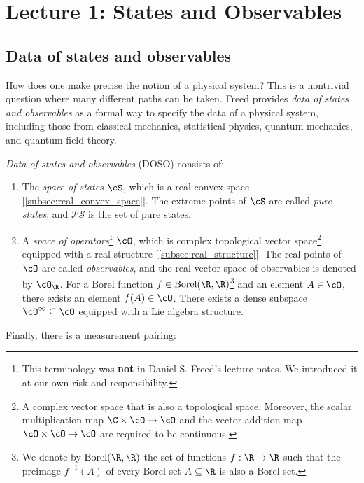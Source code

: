 \newpage
\section{Lecture 1: States and Observables}
\subsection{Data of states and observables}
How does one make precise the notion of a physical system? This is a nontrivial question where many different paths can be taken. Freed provides \emph{data of states and observables} \cite{freed} as a formal way to specify the data of a physical system, including those from classical mechanics, statistical physics, quantum mechanics, and quantum field theory.

\begin{definition} \label{defn:DOSO}

\emph{Data of states and observables} (DOSO) consists of:
\begin{enumerate}
    \item The \emph{space of states} $\cS$, which is a real convex space [\ref{subsec:real_convex_space}]. The extreme points of $\cS$ are called \emph{pure states}, and $\mathcal{PS}$ is the set of pure states.

    \item A \emph{space of operators}\footnote{This terminology was \textbf{not} in Daniel S. Freed's lecture notes. We introduced it at our own risk and responsibility.} $\cO$, which is complex topological vector space\footnote{A complex vector space that is also a topological space. Moreover, the scalar multiplication map $\C \times \cO \to \cO$ and the vector addition map $\cO \times \cO \to \cO$ are required to be continuous.} equipped with a real structure [\ref{subsec:real_structure}]. The real points of $\cO$ are called \emph{observables}, and the real vector space of observables is denoted by $\cO_\R$. For a Borel function $f \in \textnormal{Borel}(\R, \R)$\footnote{We denote by $\textnormal{Borel}(\R, \R)$ the set of functions $f: \R \to \R$ such that the preimage $f^{-1}(A)$ of every Borel set $A \subseteq \R$ is also a Borel set.} and an element $A \in \cO$, there exists an element $f(A) \in \cO$. There exists a dense subspace $\cO^\infty \subseteq \cO$ equipped with a Lie algebra structure.
\end{enumerate}
\end{definition}

Finally, there is a measurement pairing:

